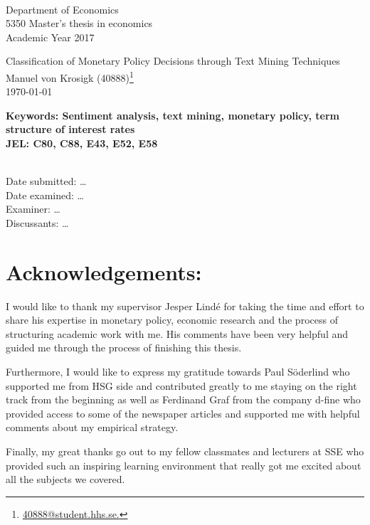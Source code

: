	\singlespacing
	\\
	Department of Economics\\
	5350 Master’s thesis in economics\\
	Academic Year 2017\\

	\vspace{1cm}	
	\begin{centering}
		\Large{Classification of Monetary Policy Decisions through Text Mining Techniques}\\
		\vspace{.5cm}	
		\large{Manuel von Krosigk (40888)}\footnote{\href{mailto:40888@student.hhs.se}{40888@student.hhs.se.}}\\
		\vspace{.5cm}	
		\large{\today}\\
	\end{centering}	
	\begin{abstract}
		
	\end{abstract}
	\textbf{Keywords: Sentiment analysis, text mining, monetary policy, term structure of interest rates}
	\\\textbf{JEL: C80, C88, E43, E52, E58} %
	
	\vfill
	\\Date submitted: \dots
	\\Date examined: \dots
	\\Examiner: \dots
	\\Discussants: \dots

\newpage
\section*{Acknowledgements:}
I would like to thank my supervisor Jesper Lindé for taking the time and effort to share his expertise in monetary policy, economic research and the process of structuring academic work with me. His comments have been very helpful and guided me through the process of finishing this thesis. 

Furthermore, I would like to express my gratitude towards Paul Söderlind who supported me from HSG side and contributed greatly to me staying on the right track from the beginning as well as Ferdinand Graf from the company d-fine who provided access to some of the newspaper articles and supported me with helpful comments about my empirical strategy.

Finally, my great thanks go out to my fellow classmates and lecturers at SSE who provided such an inspiring learning environment that really got me excited about all the subjects we covered.
